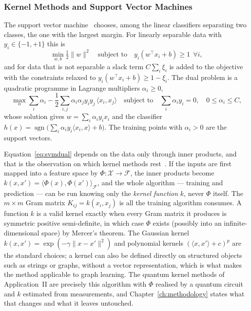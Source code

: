 \subsubsection{Kernel Methods and Support Vector Machines}
\label{sec:ml-kernels}
The support vector machine~\cite{Valkenborg_2023, Awad_2015} chooses, among
the linear classifiers separating two classes, the one with the largest
margin. For linearly separable data with $y_i \in \{-1, +1\}$ this is
\begin{equation}
	\min_{w, b} \tfrac{1}{2} \|w\|^2 \quad \text{subject to} \quad y_i (w^\top x_i + b) \ge 1 \ \ \forall i,
\end{equation}
and for data that is not separable a slack term $C \sum_i \xi_i$ is added
to the objective with the constraints relaxed to
$y_i(w^\top x_i + b) \ge 1 - \xi_i$. The dual problem is a quadratic programme
in Lagrange multipliers $\alpha_i \ge 0$,
\begin{equation}
	\max_{\alpha} \sum_i \alpha_i - \frac{1}{2} \sum_{i, j} \alpha_i \alpha_j y_i y_j\, \langle x_i, x_j \rangle
	\quad \text{subject to} \quad \sum_i \alpha_i y_i = 0, \quad 0 \le \alpha_i \le C,
	\label{eq:svmdual}
\end{equation}
whose solution gives $w = \sum_i \alpha_i y_i x_i$ and the classifier
$h(x) = \operatorname{sgn}\bigl(\sum_i \alpha_i y_i \langle x_i, x \rangle + b\bigr)$.
The training points with $\alpha_i > 0$ are the support vectors.

Equation~\eqref{eq:svmdual} depends on the data only through inner products,
and that is the observation on which kernel methods rest~\cite{Hofmann_2008}.
If the inputs are first mapped into a feature space by
$\Phi : \mathcal{X} \to \mathcal{F}$, the inner products become
$k(x, x') = \langle \Phi(x), \Phi(x') \rangle_{\mathcal{F}}$, and the whole
algorithm --- training and prediction --- can be run knowing only the
\emph{kernel function} $k$, never $\Phi$ itself. The $m \times m$ Gram matrix
$K_{ij} = k(x_i, x_j)$ is all the training algorithm consumes. A function $k$
is a valid kernel exactly when every Gram matrix it produces is symmetric
positive semi-definite, in which case $\Phi$ exists (possibly into an
infinite-dimensional space) by Mercer's theorem. The Gaussian kernel
$k(x, x') = \exp(-\gamma \|x - x'\|^2)$ and polynomial kernels
$(\langle x, x' \rangle + c)^p$ are the standard choices; a kernel can also
be defined directly on structured objects such as strings or graphs, without
a vector representation, which is what makes the method applicable to graph
learning. The quantum kernel methods of Application~II are precisely this
algorithm with $\Phi$ realised by a quantum circuit and $k$ estimated from
measurements, and Chapter~\ref{ch:methodology} states what that changes and
what it leaves untouched.

